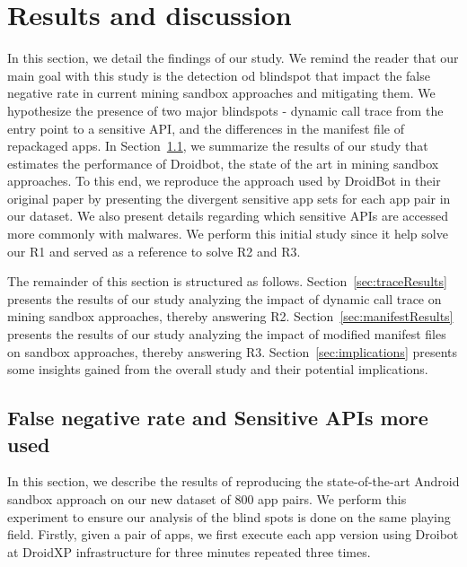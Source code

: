 \section{Results and discussion}\label{sec:results}

In this section, we detail the findings of our study.  We remind the reader that our main goal with this study is the detection od blindspot that impact the false negative rate in current mining sandbox approaches and mitigating them. We hypothesize the presence of two major blindspots - dynamic call trace from the entry point to a sensitive API, and the differences in the manifest file of repackaged apps. In Section~\ref{sec:Sensitive APIs}, we summarize the results of our study that estimates the performance of Droidbot, the state of the art in mining sandbox approaches. To this end, we reproduce the approach used by DroidBot in their original paper by presenting the divergent sensitive app sets for each app pair in our dataset. We also present details regarding which sensitive APIs are accessed more commonly with malwares. 
We perform this initial study since it help solve our R1 and served as a reference to solve R2 and R3. 

The remainder of this section is structured as follows. Section~\ref{sec:traceResults} presents the results of our study analyzing the impact of dynamic call trace on mining sandbox approaches, thereby answering R2. Section~\ref{sec:manifestResults} presents the results of our study analyzing the impact of modified manifest files on sandbox approaches, thereby answering R3. Section~\ref{sec:implications} presents some insights gained from the overall study and their potential implications.

\subsection{False negative rate and Sensitive APIs more used}\label{sec:Sensitive APIs}

In this section, we describe the results of reproducing the state-of-the-art Android sandbox approach on our new dataset of $800$ app pairs. We perform this experiment to ensure our analysis of the blind spots is done on the same playing field. Firstly, given a pair of apps, we first execute each app version using Droibot at DroidXP infrastructure for three minutes repeated three times.

